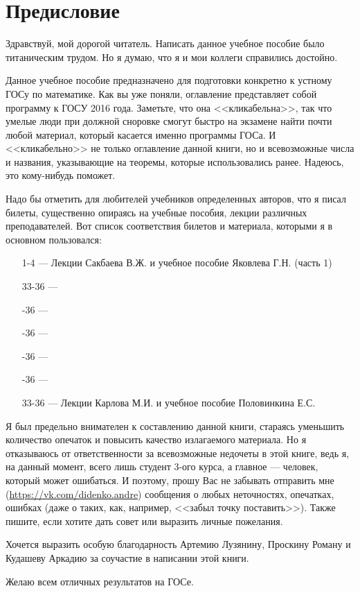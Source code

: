 \chapter{Предисловие}
Здравствуй, мой дорогой читатель. Написать данное учебное пособие было титаническим трудом. Но я думаю, что я и мои коллеги справились достойно.

Данное учебное пособие предназначено для подготовки конкретно к устному ГОСу по математике. Как вы уже поняли, оглавление представляет собой программу к ГОСУ 2016 года. Заметьте, что она <<кликабельна>>, так что умелые люди при должной сноровке смогут быстро на экзамене найти почти любой материал, который касается именно программы ГОСа. И <<кликабельно>> не только оглавление данной книги, но и всевозможные числа и названия, указывающие на теоремы, которые использовались ранее. Надеюсь, это кому-нибудь поможет. 

Надо бы отметить для любителей учебников определенных авторов, что я писал билеты, существенно опираясь на учебные пособия, лекции различных преподавателей. Вот список соответствия билетов и материала, которыми я в основном пользовался:
\begin{itemize}
\item[1-4]
\; --- \: Лекции Сакбаева В.Ж. и учебное пособие Яковлева Г.Н. (часть 1)
\item[33-36]
\; --- \:
\item[\sffamily 33-36]
\; --- \:
\item[\sffamily 33-36]
\; --- \:
\item[\sffamily 33-36]
\; --- \:
\item[\sffamily 33-36]
\; --- \:
\item[33-36]
\; --- \: Лекции Карлова М.И. и учебное пособие Половинкина Е.С.
\end{itemize}

Я был предельно внимателен к составлению данной книги, стараясь уменьшить количество опечаток и повысить качество излагаемого материала. Но я отказываюсь от ответственности за всевозможные недочеты в этой книге, ведь я, на данный момент, всего лишь студент 3-ого курса, а главное --- человек, который может ошибаться. И поэтому, прошу Вас не забывать отправить мне (\url{https://vk.com/didenko.andre}) сообщения о любых неточностях, опечатках, ошибках (даже о таких, как, например, <<забыл точку поставить>>). Также пишите, если хотите дать совет или выразить личные пожелания. 

Хочется выразить особую благодарность Артемию Лузянину, Проскину Роману и Кудашеву Аркадию за соучастие в написании этой книги.
 
\vspace*{\baselineskip}
Желаю всем отличных результатов на ГОСе.